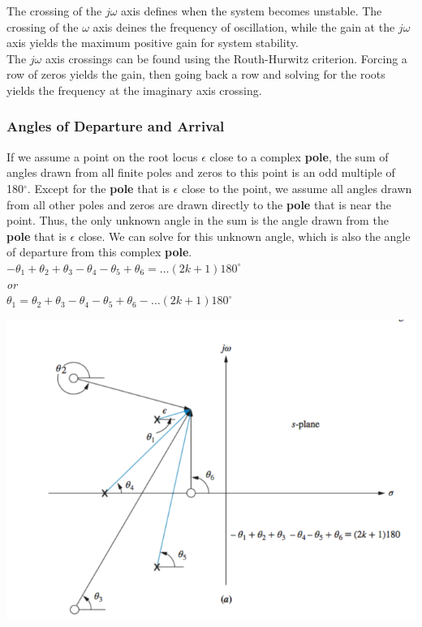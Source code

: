 \documentclass[11pt]{article}
\begin{document}
    The crossing of the $j\omega$ axis defines when the system becomes unstable. The crossing of the $\omega$ axis deines the frequency of oscillation, while the gain at the $j\omega$ axis yields the maximum positive gain for system stability. \\ 

    The $j\omega$ axis crossings can be found using the Routh-Hurwitz criterion. Forcing a row of zeros yields the gain, then going back a row and solving for the roots yields the frequency at the imaginary axis crossing.

    \subsubsection{Angles of Departure and Arrival}

    If we assume a point on the root locus $\epsilon$ close to a complex \textbf{pole}, the sum of angles drawn from all finite poles and zeros to this point is an odd multiple of 180$^\circ$. Except for the \textbf{pole} that is $\epsilon$ close to the point, we assume all angles drawn from all other poles and zeros are drawn directly to the \textbf{pole} that is near the point. Thus, the only unknown angle in the sum is the angle drawn from the \textbf{pole} that is $\epsilon$ close. We can solve for this unknown angle, which is also the angle of departure from this complex \textbf{pole}. \\

    $-\theta_1 + \theta_2 + \theta_3 - \theta_4 - \theta_5 + \theta_6 =(2k+1)180^\circ$ \\ 
    
    \textit{or} \\ 

    $\theta_1 = \theta_2 + \theta_3 - \theta_4 - \theta_5 + \theta_6 -(2k+1)180^\circ$ \\

    \begin{center}
        \includegraphics[width=300 px]{img/angles-pole} \\
    \end{center}    
    
\end{document}
